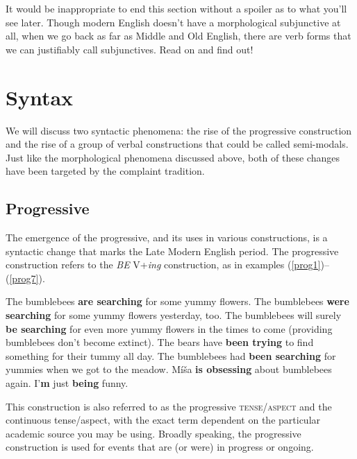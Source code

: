 It would be inappropriate to end this section without a spoiler as to what you'll see later. Though modern English doesn't have a morphological subjunctive at all, when we go back as far as Middle and Old English, there are verb forms that we can justifiably call subjunctives. Read on and find out!


\section{Syntax}\label{LModE-syntax}
We will discuss two syntactic phenomena: the rise of the progressive construction and the rise of a group of verbal constructions that could be called semi-modals. Just like the morphological phenomena discussed above, both of these changes have been targeted by the complaint tradition.

\subsection{Progressive}\label{LModE-progressive}
The emergence of the progressive, and its uses in various constructions, is a syntactic change that marks the Late Modern English period. The progressive construction refers to the \textit{BE} V+\textit{ing} construction, as in examples (\ref{prog1})--(\ref{prog7}).

\begin{exe}
    \ex\label{prog1} The bumblebees \textbf{are searching} for some yummy flowers.
    \ex The bumblebees \textbf{were searching} for some yummy flowers yesterday, too.
    \ex The bumblebees will surely \textbf{be searching} for even more yummy flowers in the times to come (providing bumblebees don't become extinct).
    \ex The bears have \textbf{been trying} to find something for their tummy all day.
    \ex The bumblebees had \textbf{been searching} for yummies when we got to the meadow.
    \ex Míša \textbf{is obsessing} about bumblebees again.
    \ex\label{prog7} I'\textbf{m} just \textbf{being} funny.
\end{exe}

\noindent This construction is also referred to as the progressive \textsc{tense}/\textsc{aspect} and the continuous tense/aspect, with the exact term dependent on the particular academic source you may be using. Broadly speaking, the progressive construction is used for events that are (or were) in progress or ongoing.

